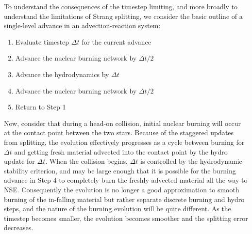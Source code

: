 \documentclass[twocolumn,numberedappendix]{../aastex6}
\begin{document}
To understand the consequences of the timestep limiting, and more broadly to 
understand the limitations of Strang splitting, we consider the 
basic outline of a single-level advance in an advection-reaction system:
\begin{enumerate}
  \item Evaluate timestep $\Delta t$ for the current advance
  \item Advance the nuclear burning network by $\Delta t / 2$
  \item Advance the hydrodynamics by $\Delta t$
  \item Advance the nuclear burning network by $\Delta t / 2$
  \item Return to Step 1
\end{enumerate}
Now, consider that during a head-on collision, initial nuclear burning 
will occur at the contact point between the two stars. Because of 
the staggered updates from splitting, the evolution effectively progresses 
as a cycle between burning for $\Delta t$ and getting fresh material 
advected into the contact point by the hydro update for $\Delta t$. 
When the collision begins, $\Delta t$ is controlled by the hydrodynamic 
stability criterion, and may be large enough that it is possible for 
the burning advance in Step 4 to completely burn the freshly advected 
material all the way to NSE. Consequently the evolution is no longer 
a good approximation to smooth burning of the in-falling material but
rather separate discrete burning and hydro steps, and the nature of 
the burning evolution will be quite different. As the timestep becomes
smaller, the evolution becomes smoother and the splitting error decreases.
\end{document}
